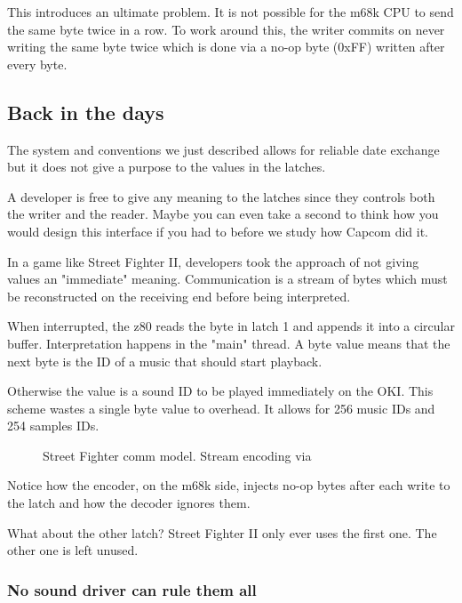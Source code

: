This introduces an ultimate problem. It is not possible for the m68k CPU to send the same byte twice in a row. To work around this, the writer commits on never writing the same byte twice which is done via a no-op byte (0xFF) written after every byte.




\subsection{Back in the days}
The system and conventions we just described allows for reliable date exchange but it does not give a purpose to the values in the latches. 

A developer is free to give any meaning to the latches since they controls both the writer and the reader. Maybe you can even take a second to think how you would design this interface if you had to before we study how Capcom did it.

In a game like Street Fighter II, developers took the approach of not giving values an "immediate" meaning. Communication is a stream of bytes which must be reconstructed on the receiving end before being interpreted.



When interrupted, the z80 reads the byte in latch 1 and appends it into a circular buffer. Interpretation happens in the "main" thread. A byte value  means that the next byte is the ID of a music that should start playback. 

Otherwise the value is a sound ID to be played immediately on the OKI. This scheme wastes a single byte value to overhead. It allows for 256 music IDs and 254 samples IDs.

 \begin{figure}[H]
\caption*{Street Fighter comm model. Stream encoding via }
\end{figure}

Notice how the encoder, on the m68k side, injects  no-op bytes after each write to the latch and how the decoder ignores them.

What about the other latch? Street Fighter II only ever uses the first one. The other one is left unused.

\subsubsection{No sound driver can rule them all}

